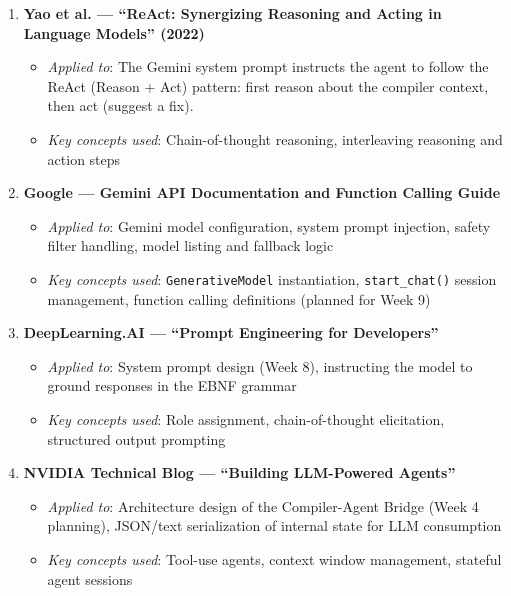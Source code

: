 \documentclass[a4paper,11pt]{article}
\begin{document}
\begin{enumerate}
    \item \textbf{Yao et al. --- ``ReAct: Synergizing Reasoning and Acting in Language Models'' (2022)}
    \begin{itemize}
        \item \textit{Applied to}: The Gemini system prompt instructs the agent to follow the ReAct (Reason + Act) pattern: first reason about the compiler context, then act (suggest a fix).
        \item \textit{Key concepts used}: Chain-of-thought reasoning, interleaving reasoning and action steps
    \end{itemize}

    \item \textbf{Google --- Gemini API Documentation and Function Calling Guide}
    \begin{itemize}
        \item \textit{Applied to}: Gemini model configuration, system prompt injection, safety filter handling, model listing and fallback logic
        \item \textit{Key concepts used}: \texttt{GenerativeModel} instantiation, \texttt{start\_chat()} session management, function calling definitions (planned for Week 9)
    \end{itemize}

    \item \textbf{DeepLearning.AI --- ``Prompt Engineering for Developers''}
    \begin{itemize}
        \item \textit{Applied to}: System prompt design (Week 8), instructing the model to ground responses in the EBNF grammar
        \item \textit{Key concepts used}: Role assignment, chain-of-thought elicitation, structured output prompting
    \end{itemize}

    \item \textbf{NVIDIA Technical Blog --- ``Building LLM-Powered Agents''}
    \begin{itemize}
        \item \textit{Applied to}: Architecture design of the Compiler-Agent Bridge (Week 4 planning), JSON/text serialization of internal state for LLM consumption
        \item \textit{Key concepts used}: Tool-use agents, context window management, stateful agent sessions
    \end{itemize}
\end{enumerate}
\end{document}
